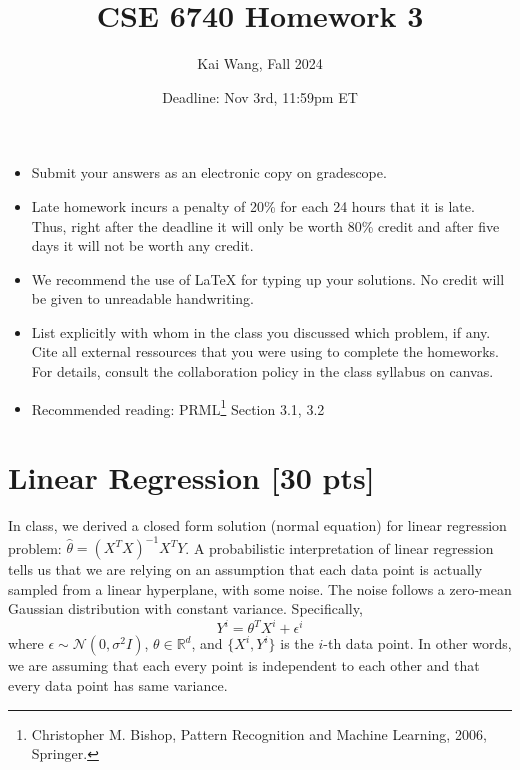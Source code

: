 \documentclass[twoside,10pt]{article}
\begin{document}
\title{CSE 6740 Homework 3}
\author{Kai Wang, Fall 2024}
\date{Deadline: Nov 3rd, 11:59pm ET}
\maketitle

\begin{itemize}
  \item Submit your answers as an electronic copy on gradescope.
  \item Late homework incurs a penalty of 20\% for each 24 hours that it is late. Thus, right after the deadline it will only be worth 80\% credit and after five days it will not be worth any credit.
  \item We recommend the use of LaTeX for typing up your solutions. No credit will be given to unreadable handwriting.
  \item List explicitly with whom in the class you discussed which problem, if any. Cite all external ressources that you were using to complete the homeworks. For details, consult the collaboration policy in the class syllabus on canvas.  
  \item Recommended reading: PRML\footnote{Christopher M. Bishop, Pattern Recognition and Machine
Learning, 2006, Springer.} Section 3.1, 3.2
\end{itemize}

\section{Linear Regression [30 pts]}

In class, we derived a closed form solution (normal equation) for
linear regression problem: $\hat{\theta} = (X^T X)^{-1} X^T Y$. A
probabilistic interpretation of linear regression tells us that we
are relying on an assumption that each data point is actually
sampled from a linear hyperplane, with some noise. The noise
follows a zero-mean Gaussian distribution with constant variance.
Specifically,
\begin{equation}
Y^i = \theta^T X^i + \epsilon^i
\label{eqn:linear_model}
\end{equation}
where $\epsilon \sim \mathcal{N}(0, \sigma^2 I)$, $\theta \in \mathbb{R}^d$, and $\{X^i, Y^i\}$ is the $i$-th data point. In other words,
we are assuming that each every point is independent to each other
and that every data point has same variance.
\end{document}
